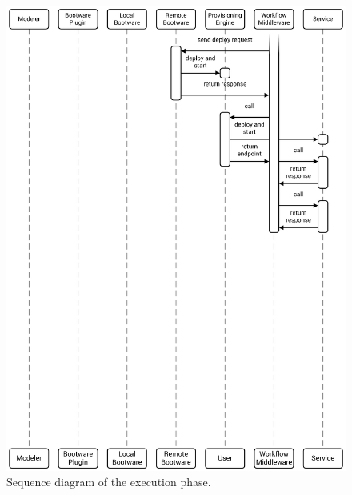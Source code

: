 \begin{figure}[!htbp]
	\centering
	\includegraphics[resolution=600]{process/assets/execution_sequence}
	\caption{Sequence diagram of the execution phase.}
	\label{image:execution_sequence}
\end{figure}
